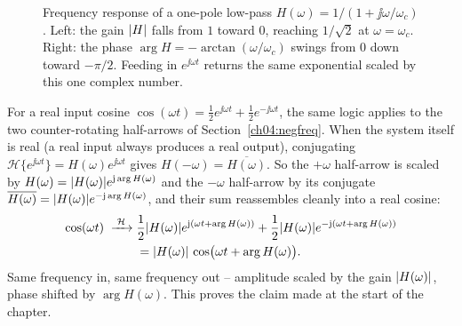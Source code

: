 \begin{figure}[H]
\centering
{}
\caption{Frequency response of a one-pole low-pass $H(\omega)=1/(1+\jj\omega/\omega_c)$. Left: the
gain $\lvert H\rvert$ falls from $1$ toward $0$, reaching $1/\sqrt2$ at $\omega=\omega_c$. Right: the phase
$\arg H = -\arctan(\omega/\omega_c)$ swings from $0$ down toward $-\pi/2$. Feeding in
$e^{\jj\omega t}$ returns the same exponential scaled by this one complex number.}
\label{ch04:fig-freqresp}
\end{figure}

For a real input cosine $\cos(\omega t) = \tfrac12 e^{\jj\omega t} + \tfrac12 e^{-\jj\omega t}$, the
same logic applies to the two counter-rotating half-arrows of Section~\ref{ch04:negfreq}. When the
system itself is real (a real input always produces a real output), conjugating
$\mathcal{H}\{e^{\jj\omega t}\} = H(\omega)e^{\jj\omega t}$ gives $H(-\omega) = \overline{H(\omega)}$.
So the $+\omega$ half-arrow is scaled by $H(\omega) = \lvert H(\omega)\rvert e^{\mathrm{j}\arg H(\omega)}$ and the
$-\omega$ half-arrow by its conjugate $\overline{H(\omega)} = \lvert H(\omega)\rvert e^{-\mathrm{j}\arg H(\omega)}$,
and their sum reassembles cleanly into a real cosine:
\begin{align*}
  \cos(\omega t) \;\xrightarrow{\;\mathcal{H}\;}\;&
  \frac{1}{2}\lvert H(\omega)\rvert e^{\mathrm{j}(\omega t + \arg H(\omega))}
  + \frac{1}{2}\lvert H(\omega)\rvert e^{-\mathrm{j}(\omega t + \arg H(\omega))} \\
  &= \lvert H(\omega)\rvert\,\cos\!\big(\omega t + \arg H(\omega)\big).
\end{align*}
Same frequency in, same frequency out -- amplitude scaled by the gain $\lvert H(\omega)\rvert$, phase
shifted by $\arg H(\omega)$. This proves the claim made at the start of the chapter.

